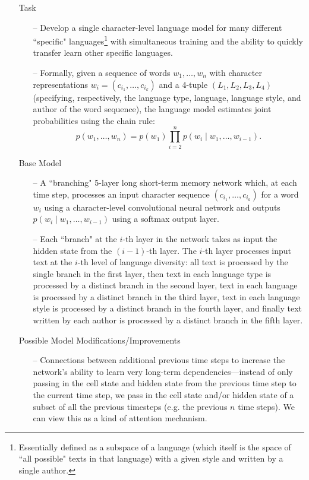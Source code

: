 \documentclass[12pt,letterpaper]{article}
\theoremstyle{remark}
\theoremstyle{plain}
\begin{document}
\begin{enumerate}
\item[] Task
\begin{enumerate}
\item[--] Develop a single character-level language model for many different ``specific" languages\footnote{Essentially defined as a subspace of a language (which itself is the space of ``all possible" texts in that language) with a given style and written by a single author.} with simultaneous training and the ability to quickly transfer learn other specific languages.
\item[--] Formally, given a sequence of words $w_{1}, \ldots, w_{n}$ with character representations $w_{i} = (c_{i_{1}}, \ldots, c_{i_{k}})$ and a 4-tuple $(L_{1}, L_{2}, L_{3}, L_{4})$ (specifying, respectively, the language type, language, language style, and author of the word sequence), the language model estimates joint probabilities using the chain rule:
$$p(w_{1}, \ldots, w_{n}) = p(w_{1})\prod_{i=2}^{n}p(w_{i} \mid w_{1}, \ldots, w_{i-1}).$$
\end{enumerate}
\item[] Base Model
\begin{enumerate}
\item[--] A ``branching" 5-layer long short-term memory network which, at each time step, processes an input character sequence $(c_{i_{1}}, \ldots, c_{i_{k}})$ for a word $w_{i}$ using a character-level convolutional neural network and outputs $p(w_{i} \mid w_{1}, \ldots, w_{i-1})$ using a softmax output layer. 
\item[--] Each ``branch" at the $i$-th layer in the network takes as input the hidden state from the $(i-1)$-th layer. The $i$-th layer processes input text at the $i$-th level of language diversity: all text is processed by the single branch in the first layer, then text in each language type is processed by a distinct branch in the second layer, text in each language is processed by a distinct branch in the third layer, text in each language style is processed by a distinct branch in the fourth layer, and finally text written by each author is processed by a distinct branch in the fifth layer. 
\end{enumerate}
\item[] Possible Model Modifications/Improvements
\begin{enumerate}
\item[--] Connections between additional previous time steps to increase the network's ability to learn very long-term dependencies---instead of only passing in the cell state and hidden state from the previous time step to the current time step, we pass in the cell state and/or hidden state of a subset of all the previous timesteps (e.g. the previous $n$ time steps). We can view this as a kind of attention mechanism. 

\end{enumerate}
\end{enumerate}
\end{document}

